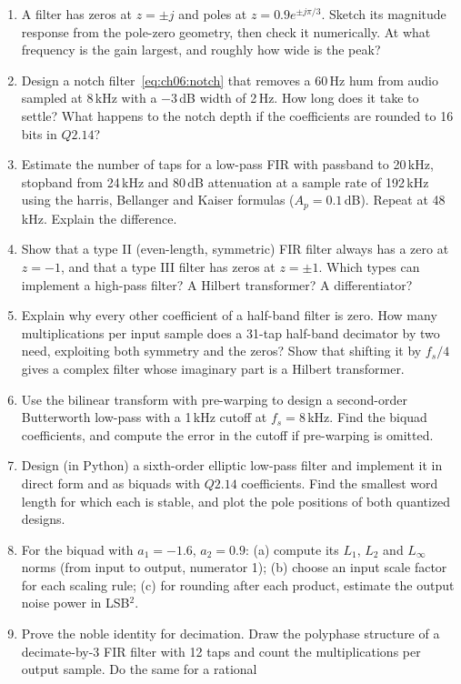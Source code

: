 \problems
\begin{enumerate}[label=\thechapter.\arabic*]
\item A filter has zeros at $z=\pm j$ and poles at $z=0.9e^{\pm j\pi/3}$. Sketch its magnitude response
from the pole-zero geometry, then check it numerically. At what frequency is the gain largest, and
roughly how wide is the peak?
\item Design a notch filter~\eqref{eq:ch06:notch} that removes a 60\,Hz hum from audio sampled at
8\,kHz with a $-3$\,dB width of 2\,Hz. How long does it take to settle? What happens to the notch
depth if the coefficients are rounded to 16 bits in $Q2.14$?
\item Estimate the number of taps for a low-pass FIR with passband to 20\,kHz, stopband from
24\,kHz and 80\,dB attenuation at a sample rate of 192\,kHz using the harris, Bellanger and Kaiser
formulas ($A_p=0.1$\,dB). Repeat at 48\,kHz. Explain the difference.
\item Show that a type II (even-length, symmetric) FIR filter always has a zero at $z=-1$, and that a
type III filter has zeros at $z=\pm1$. Which types can implement a high-pass filter? A Hilbert
transformer? A differentiator?
\item Explain why every other coefficient of a half-band filter is zero. How many multiplications per
input sample does a 31-tap half-band decimator by two need, exploiting both symmetry and the zeros?
Show that shifting it by $f_s/4$ gives a complex filter whose imaginary part is a Hilbert transformer.
\item Use the bilinear transform with pre-warping to design a second-order Butterworth low-pass with a
1\,kHz cutoff at $f_s=8$\,kHz. Find the biquad coefficients, and compute the error in the cutoff if
pre-warping is omitted.
\item Design (in Python) a sixth-order elliptic low-pass filter and implement it in direct form and as
biquads with $Q2.14$ coefficients. Find the smallest word length for which each is stable, and plot the
pole positions of both quantized designs.
\item For the biquad with $a_1=-1.6$, $a_2=0.9$: (a) compute its $L_1$, $L_2$ and $L_\infty$ norms (from
input to output, numerator 1); (b) choose an input scale factor for each scaling rule; (c) for rounding
after each product, estimate the output noise power in LSB$^2$.
\item Prove the noble identity for decimation. Draw the polyphase structure of a decimate-by-3 FIR
filter with 12 taps and count the multiplications per output sample. Do the same for a rational

\end{enumerate}
